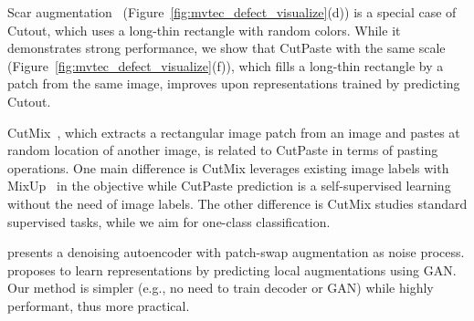 \documentclass[final]{cvpr}
\begin{document}
Scar augmentation~\cite{scar2020} (Figure~\ref{fig:mvtec_defect_visualize}(d)) is a special case of Cutout, which uses a long-thin rectangle with random colors. While it demonstrates  strong performance, we show that CutPaste with the same scale (Figure~\ref{fig:mvtec_defect_visualize}(f)), which fills a long-thin rectangle by a patch from the same image, improves upon representations trained by predicting Cutout.

CutMix~\cite{yun2019cutmix}, which extracts a rectangular image patch from an image and pastes at random location of another image, is related to CutPaste in terms of pasting operations. One main difference is CutMix leverages existing image labels with MixUp~\cite{zhang2017mixup} in the objective while CutPaste prediction is a self-supervised learning without the need of image labels. The other difference is CutMix studies standard supervised tasks, while we aim for one-class classification.

\cite{chen2019self} presents a denoising autoencoder with patch-swap augmentation as noise process. \cite{jenni2020steering} proposes to learn representations by predicting local augmentations using GAN. Our method is simpler (e.g., no need to train decoder or GAN) while highly performant, thus more practical. 
\end{document}
